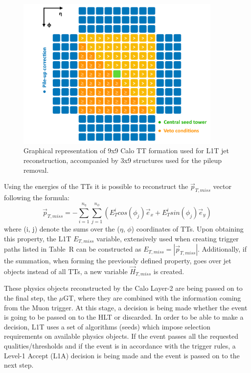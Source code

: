 \begin{figure}[htbp]
  \centering
    \includegraphics[width=0.9\textwidth]{CMS_experiment/jet_chunky.pdf}
  \caption{Graphical representation of 9x9 Calo TT formation used for L1T jet reconstruction, accompanied by 3x9 structures used for the pileup removal.}
  \label{fig:l1_jet_chunky}
\end{figure} 

Using the energies of the TTs it is possible to reconstruct the $\vec{p}_{T,miss}$ vector following the formula:
\begin{equation}
 \vec{p}_{T,miss} = -\sum_{i=1}^{n_{\eta}}\sum_{j=1}^{n_{\phi}}(E^{i}_{T}cos(\phi_j)\vec{e}_x + E^{i}_{T}sin(\phi_j)\vec{e}_y)
\end{equation}
 where (i, j) denote the sums over the ($\eta$, $\phi$) coordinates of TTs. Upon obtaining this property, the L1T $E_{T, miss}$ variable, extensively used when creating trigger paths listed in Table~{R} can be constructed as $E_{T, miss} = |\vec{p}_{T,miss}|$. Additionally, if the summation, when forming the previously defined property, goes over jet objects instead of all TTs, a new variable $\vec{H}_{T,miss}$ is created. 
 
\hspace{10pt} These physics objects reconstructed by the Calo Layer-2 are being passed on to the final step, the $\mu$GT, where they are combined with the information coming from the Muon trigger. At this stage, a decision is being made whether the event is going to be passed on to the HLT or discarded. In order to be able to make a decision, L1T uses a set of algorithms (seeds) which impose selection requirements on available physics objects. If the event passes all the requested qualities/thresholds and if the event is in accordance with the trigger rules, a Level-1 Accept (L1A) decision is being made and the event is passed on to the next step.

